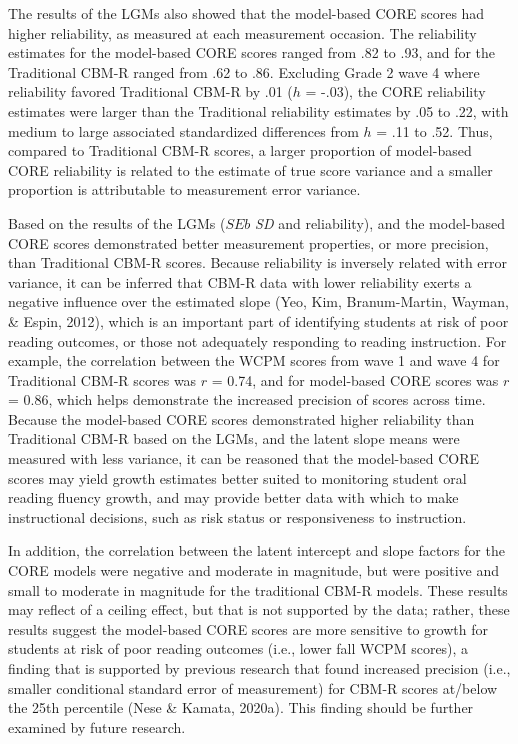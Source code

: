 \documentclass[
  english,
  man, fleqn, noextraspace]{apa6}
\begin{document}
The results of the LGMs also showed that the model-based CORE scores had higher reliability, as measured at each measurement occasion. The reliability estimates for the model-based CORE scores ranged from .82 to .93, and for the Traditional CBM-R ranged from .62 to .86. Excluding Grade 2 wave 4 where reliability favored Traditional CBM-R by .01 (\(h\) = -.03), the CORE reliability estimates were larger than the Traditional reliability estimates by .05 to .22, with medium to large associated standardized differences from \(h\) = .11 to .52. Thus, compared to Traditional CBM-R scores, a larger proportion of model-based CORE reliability is related to the estimate of true score variance and a smaller proportion is attributable to measurement error variance.

Based on the results of the LGMs (\(SEb\) \emph{SD} and reliability), and the model-based CORE scores demonstrated better measurement properties, or more precision, than Traditional CBM-R scores. Because reliability is inversely related with error variance, it can be inferred that CBM-R data with lower reliability exerts a negative influence over the estimated slope (Yeo, Kim, Branum-Martin, Wayman, \& Espin, 2012), which is an important part of identifying students at risk of poor reading outcomes, or those not adequately responding to reading instruction. For example, the correlation between the WCPM scores from wave 1 and wave 4 for Traditional CBM-R scores was \(r\) = 0.74, and for model-based CORE scores was \(r\) = 0.86, which helps demonstrate the increased precision of scores across time. Because the model-based CORE scores demonstrated higher reliability than Traditional CBM-R based on the LGMs, and the latent slope means were measured with less variance, it can be reasoned that the model-based CORE scores may yield growth estimates better suited to monitoring student oral reading fluency growth, and may provide better data with which to make instructional decisions, such as risk status or responsiveness to instruction.

In addition, the correlation between the latent intercept and slope factors for the CORE models were negative and moderate in magnitude, but were positive and small to moderate in magnitude for the traditional CBM-R models. These results may reflect of a ceiling effect, but that is not supported by the data; rather, these results suggest the model-based CORE scores are more sensitive to growth for students at risk of poor reading outcomes (i.e., lower fall WCPM scores), a finding that is supported by previous research that found increased precision (i.e., smaller conditional standard error of measurement) for CBM-R scores at/below the 25th percentile (Nese \& Kamata, 2020a). This finding should be further examined by future research.
\end{document}
